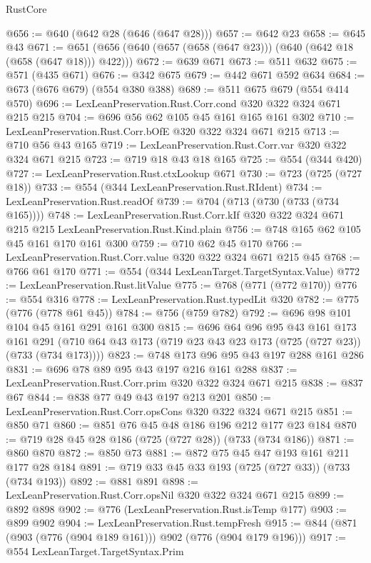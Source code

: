 \begin{lexlean}{RustCore}
\begin{coremodule}
@656 := @640 (@642 @28 (@646 (@647 @28)))
@657 := @642 @23
@658 := @645 @43
@671 := @651 (@656 (@640 (@657 (@658 (@647 @23))) (@640 (@642 @18 (@658 (@647 @18))) @422)))
@672 := @639 @671
@673 := @511 @632
@675 := @571 (@435 @671)
@676 := @342 @675
@679 := @442 @671 @592 @634
@684 := @673 (@676 @679) (@554 @380 @388)
@689 := @511 @675 @679 (@554 @414 @570)
@696 := LexLeanPreservation.Rust.Corr.cond @320 @322 @324 @671 @215 @215
@704 := @696 @56 @62 @105 @45 @161 @165 @161 @302
@710 := LexLeanPreservation.Rust.Corr.bOfE @320 @322 @324 @671 @215
@713 := @710 @56 @43 @165
@719 := LexLeanPreservation.Rust.Corr.var @320 @322 @324 @671 @215
@723 := @719 @18 @43 @18 @165
@725 := @554 (@344 @420)
@727 := LexLeanPreservation.Rust.ctxLookup @671
@730 := @723 (@725 (@727 @18))
@733 := @554 (@344 LexLeanPreservation.Rust.RIdent)
@734 := LexLeanPreservation.Rust.readOf
@739 := @704 (@713 (@730 (@733 (@734 @165))))
@748 := LexLeanPreservation.Rust.Corr.kIf
    @320
    @322
    @324
    @671
    @215
    @215
    LexLeanPreservation.Rust.Kind.plain
@756 := @748 @165 @62 @105 @45 @161 @170 @161 @300
@759 := @710 @62 @45 @170
@766 := LexLeanPreservation.Rust.Corr.value @320 @322 @324 @671 @215 @45
@768 := @766 @61 @170
@771 := @554 (@344 LexLeanTarget.TargetSyntax.Value)
@772 := LexLeanPreservation.Rust.litValue
@775 := @768 (@771 (@772 @170))
@776 := @554 @316
@778 := LexLeanPreservation.Rust.typedLit @320
@782 := @775 (@776 (@778 @61 @45))
@784 := @756 (@759 @782)
@792 := @696 @98 @101 @104 @45 @161 @291 @161 @300
@815 := @696
    @64
    @96
    @95
    @43
    @161
    @173
    @161
    @291
    (@710 @64 @43 @173 (@719 @23 @43 @23 @173 (@725 (@727 @23)) (@733 (@734 @173))))
@823 := @748 @173 @96 @95 @43 @197 @288 @161 @286
@831 := @696 @78 @89 @95 @43 @197 @216 @161 @288
@837 := LexLeanPreservation.Rust.Corr.prim @320 @322 @324 @671 @215
@838 := @837 @67
@844 := @838 @77 @49 @43 @197 @213 @201
@850 := LexLeanPreservation.Rust.Corr.opsCons @320 @322 @324 @671 @215
@851 := @850 @71
@860 := @851 @76 @45 @48 @186 @196 @212 @177 @23 @184
@870 := @719 @28 @45 @28 @186 (@725 (@727 @28)) (@733 (@734 @186))
@871 := @860 @870
@872 := @850 @73
@881 := @872 @75 @45 @47 @193 @161 @211 @177 @28 @184
@891 := @719 @33 @45 @33 @193 (@725 (@727 @33)) (@733 (@734 @193))
@892 := @881 @891
@898 := LexLeanPreservation.Rust.Corr.opsNil @320 @322 @324 @671 @215
@899 := @892 @898
@902 := @776 (LexLeanPreservation.Rust.isTemp @177)
@903 := @899 @902
@904 := LexLeanPreservation.Rust.tempFresh
@915 := @844 (@871 (@903 (@776 (@904 @189 @161))) @902 (@776 (@904 @179 @196)))
@917 := @554 LexLeanTarget.TargetSyntax.Prim

\end{coremodule}
\end{lexlean}
